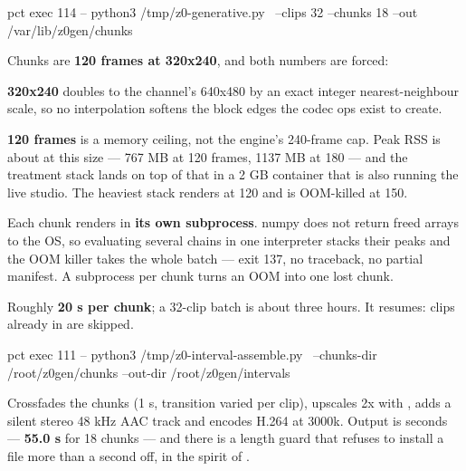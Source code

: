 \documentclass[fontpath=fonts/,logopath=logo/]{riposte-doc}
\begin{document}

\ripcodeopen
{}
\begin{ripcodeblock}
pct exec 114 -- python3 /tmp/z0-generative.py \
    --clips 32 --chunks 18 --out /var/lib/z0gen/chunks
\end{ripcodeblock}
\ripcodesizereset\ripcodeclose

Chunks are \textbf{120 frames at 320x240}, and both numbers are forced:

\begin{ripbullets}
\item \textbf{320x240} doubles to the channel's 640x480 by an exact integer nearest-neighbour scale, so no interpolation softens the block edges the codec ops exist to create.
\item \textbf{120 frames} is a memory ceiling, not the engine's 240-frame cap. Peak RSS is about \ripmono{83 MB + 5.\allowbreak{}9 MB per frame} at this size — 767 MB at 120 frames, 1137 MB at 180 — and the treatment stack lands on top of that in a 2 GB container that is also running the live studio. The heaviest stack renders at 120 and is OOM-killed at 150.
\end{ripbullets}

Each chunk renders in \textbf{its own subprocess}. numpy does not return freed arrays to the OS, so evaluating several chains in one interpreter stacks their peaks and the OOM killer takes the whole batch — exit 137, no traceback, no partial manifest. A subprocess per chunk turns an OOM into one lost chunk.

Roughly \textbf{20 s per chunk}; a 32-clip batch is about three hours. It resumes: clips already in  are skipped.



\ripcodeopen
{}
\begin{ripcodeblock}
pct exec 111 -- python3 /tmp/z0-interval-assemble.py \
    --chunks-dir /root/z0gen/chunks --out-dir /root/z0gen/intervals
\end{ripcodeblock}
\ripcodesizereset\ripcodeclose

Crossfades the chunks (1 s, transition varied per clip), upscales 2x with , adds a silent stereo 48 kHz AAC track and encodes H.264 at 3000k. Output is  seconds — \textbf{55.0 s} for 18 chunks — and there is a length guard that refuses to install a file more than a second off, in the spirit of .
\end{document}
